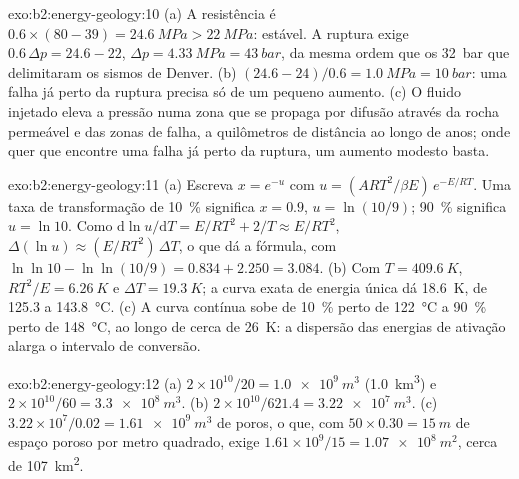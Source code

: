 \begin{solution}{exo:b2:energy-geology:10}
(a) A resistência é $0.6 \times (80 - 39) = \qty{24.6}{MPa} > \qty{22}{MPa}$: estável. A ruptura exige
$0.6\,\Delta p = 24.6 - 22$, $\Delta p = \qty{4.33}{MPa} = \qty{43}{bar}$, da mesma ordem que os
\qty{32}{bar} que delimitaram os sismos de Denver. (b) $(24.6 - 24)/0.6 = \qty{1.0}{MPa} =
\qty{10}{bar}$: uma falha já perto da ruptura precisa só de um pequeno aumento. (c) O fluido injetado eleva
a pressão numa zona que se propaga por difusão através da rocha permeável e das zonas de falha, a quilômetros
de distância ao longo de anos; onde quer que encontre uma falha já perto da ruptura, um aumento modesto basta.
\end{solution}

\begin{solution}{exo:b2:energy-geology:11}
(a) Escreva $x = e^{-u}$ com $u = (ART^2/\beta E)\,e^{-E/RT}$. Uma taxa de transformação de
\qty{10}{\percent} significa $x = 0.9$, $u = \ln(10/9)$; \qty{90}{\percent} significa $u = \ln 10$. Como
$\mathrm{d}\ln u/\mathrm{d}T = E/RT^2 + 2/T \approx E/RT^2$, $\Delta(\ln u) \approx (E/RT^2)\,\Delta T$,
o que dá a fórmula, com $\ln\ln 10 - \ln\ln(10/9) = 0.834 + 2.250 = 3.084$. (b) Com $T =
\qty{409.6}{K}$, $RT^2/E = \qty{6.26}{K}$ e $\Delta T = \qty{19.3}{K}$; a curva exata de energia única
dá \qty{18.6}{K}, de 125.3 a \qty{143.8}{\celsius}. (c) A curva contínua sobe de
\qty{10}{\percent} perto de \qty{122}{\celsius} a \qty{90}{\percent} perto de \qty{148}{\celsius}, ao longo de cerca de
\qty{26}{K}: a dispersão das energias de ativação alarga o intervalo de conversão.
\end{solution}

\begin{solution}{exo:b2:energy-geology:12}
(a) $2 \times 10^{10}/20 = \qty{1.0e9}{m^3}$ (\qty{1.0}{km^3}) e $2 \times 10^{10}/60 =
\qty{3.3e8}{m^3}$. (b) $2 \times 10^{10}/621.4 = \qty{3.22e7}{m^3}$. (c) $3.22 \times 10^7/0.02 =
\qty{1.61e9}{m^3}$ de poros, o que, com $50 \times 0.30 = \qty{15}{m}$ de espaço poroso por metro
quadrado, exige $1.61 \times 10^9/15 = \qty{1.07e8}{m^2}$, cerca de \qty{107}{km^2}.
\end{solution}


